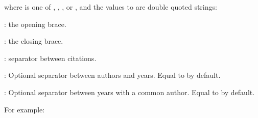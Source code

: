 \documentclass{book}
\begin{document}
\begin{mdP}[class={para-continue},data-line={3112}]%
{}where %
{}%
{} is one of %
{}%
{}, %
{}%
{}, %
{}%
{}, or %
{}%
{},
and the values %
{}%
{} to %
{}%
{} are double quoted strings:%
\end{mdP}%
\begin{mdUl}[class={list-star,compact},data-line={3115}]%
\begin{mdLi}[data-line={3115}]%
{}%
{}: the opening brace.%
\end{mdLi}%
\begin{mdLi}[data-line={3116}]%
{}%
{}: the closing brace.%
\end{mdLi}%
\begin{mdLi}[data-line={3117}]%
{}%
{}: separator between citations.%
\end{mdLi}%
\begin{mdLi}[data-line={3118}]%
{}%
{}: Optional separator between authors and years. Equal to %
{}%
{} by default.%
\end{mdLi}%
\begin{mdLi}[data-line={3119}]%
{}%
{}: Optional separator between years with a common author. Equal to %
{}%
{} by default.%
\end{mdLi}%
\end{mdUl}%
\begin{mdP}[data-line={3121}]%
{}For example:%
\end{mdP}%
\end{document}
